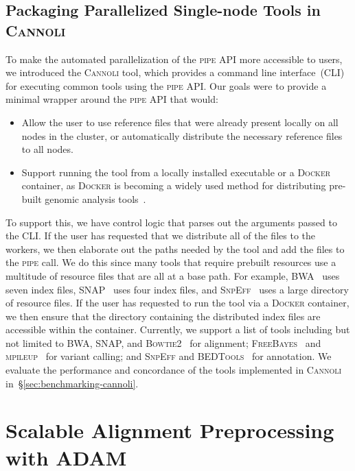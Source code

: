 \documentclass[phd]{ucbthesis}
\begin{document}
\section{Packaging Parallelized Single-node Tools in \textsc{Cannoli}}
\label{sec:parallelizing-in-cannoli}

To make the automated parallelization of the \textsc{pipe} API more accessible
to users, we introduced the \textsc{Cannoli} tool, which provides a command line
interface~(CLI) for executing common tools using the \textsc{pipe} API. Our
goals were to provide a minimal wrapper around the \textsc{pipe} API that would:

\begin{itemize}
\item Allow the user to use reference files that were already present locally on
  all nodes in the cluster, or automatically distribute the necessary reference
  files to all nodes.
\item Support running the tool from a locally installed executable or a
  \textsc{Docker} container, as \textsc{Docker} is becoming a widely used method
  for distributing pre-built genomic analysis tools~\cite{vivian17}.
\end{itemize}

To support this, we have control logic that parses out the arguments passed to
the CLI. If the user has requested that we distribute all of the files to the
workers, we then elaborate out the paths needed by the tool and add the files
to the \textsc{pipe} call. We do this since many tools that require prebuilt
resources use a multitude of resource files that are all at a base path. For
example, BWA~\cite{li09bwa} uses seven index files, SNAP~\cite{zaharia11} uses
four index files, and \textsc{SnpEff}~\cite{cingolani12} uses a large directory of
resource files. If the user has requested to run the tool via a \textsc{Docker}
container, we then ensure that the directory containing the distributed
index files are accessible within the container. Currently, we support a list of
tools including but not limited to BWA, SNAP, and
\textsc{Bowtie2}~\cite{langmead09bowtie} for alignment;
\textsc{FreeBayes}~\cite{garrison12} and \textsc{mpileup}~\cite{li11} for
variant calling; and \textsc{SnpEff} and \textsc{BEDTools}~\cite{quinlan10} for
annotation. We evaluate the performance and concordance of the tools implemented
in \textsc{Cannoli} in~\S\ref{sec:benchmarking-cannoli}.

\chapter{Scalable Alignment Preprocessing with \textsc{ADAM}}
\label{chap:adam}
\end{document}
